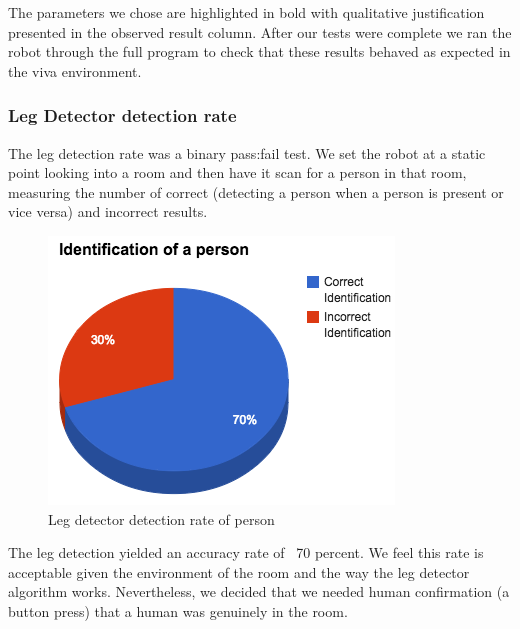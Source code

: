 \documentclass{article}
\begin{document}
 \begin{multicols}{2}
	The parameters we chose are highlighted in bold with qualitative justification presented in the observed result column. After our tests were complete we ran the robot through the full program to check that these results behaved as expected in the viva environment.
	
	\subsubsection{Leg Detector detection rate}
	The leg detection rate was a binary pass:fail test. We set the robot at a static point looking into a room and then have it scan for a person in that room, measuring the number of correct (detecting a person when a person is present or vice versa) and incorrect results.
	\begin{figure}[H]
	\begin{center}
	\includegraphics[width=0.8\linewidth]{ExperimentalResults11}
	\caption{Leg detector detection rate of person}
	\end{center}
	\end{figure}
	The leg detection yielded an accuracy rate of ~70 percent. We feel this rate is acceptable given the environment of the room and the way the leg detector algorithm works. Nevertheless, we decided that we needed human confirmation (a button press) that a human was genuinely in the room.
	

\end{multicols}
\end{document}
